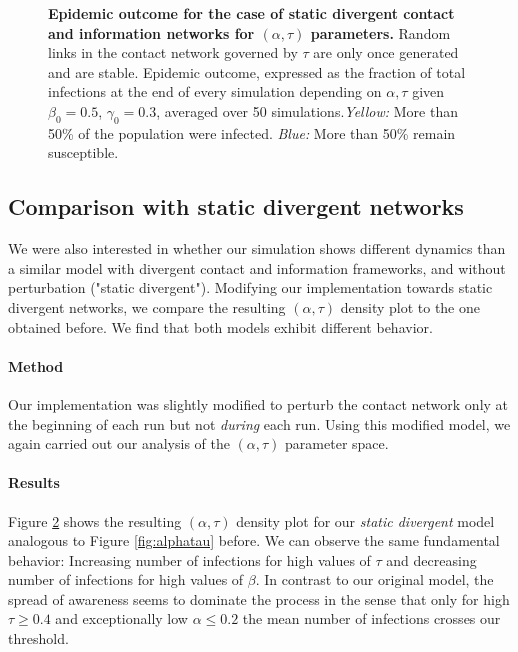 \documentclass[11pt]{article}
\begin{document}
\begin{figure}[t]
\begin{subfigure}[b]{0.45\textwidth}
        \label{fig:alphatau_static_cut}
	\end{subfigure}
    \caption{\textbf{Epidemic outcome for the case of static divergent contact and information networks for $(\alpha,\tau)$ parameters.} Random links in the contact network governed by $\tau$ are only once generated and are stable. Epidemic outcome, expressed as the fraction of total infections at the end of every simulation depending on $\alpha,\tau$ given $\beta_{0}=0.5$, $\gamma_{0}=0.3$, averaged over 50 simulations.\textit{Yellow:} More than 50\% of the population were infected. \textit{Blue:} More than 50\% remain susceptible.}
    \label{fig:alphatau_static}
\end{figure}


\subsection{Comparison with static divergent networks}

We were also interested in whether our simulation shows different dynamics than a similar model with divergent contact and information frameworks, and without perturbation ("static divergent"). Modifying our implementation towards static divergent networks, we compare the resulting $(\alpha,\tau)$ density plot to the one obtained before. We find that both models exhibit different behavior.

\paragraph{Method}
Our implementation was slightly modified to perturb the contact network only at the beginning of each run but not {\it during} each run. Using this modified model, we again carried out our analysis of the $(\alpha,\tau)$ parameter space.

\paragraph{Results}
Figure \ref{fig:alphatau_static} shows the resulting $(\alpha,\tau)$ density plot for our {\it static divergent} model analogous to Figure \ref{fig:alphatau} before. We can observe the same fundamental behavior: Increasing number of infections for high values of $\tau$ and decreasing number of infections for high values of $\beta$. In contrast to our original model, the spread of awareness seems to dominate the process in the sense that only for high $\tau \geq 0.4$ and exceptionally low $\alpha \leq 0.2$ the mean number of infections crosses our threshold.
\end{document}
